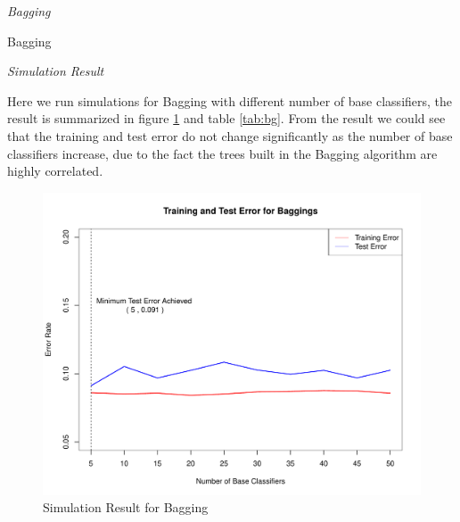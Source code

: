 \documentclass[12pt,oneside,a4paper]{article}
\begin{document}
\emph{Bagging}
\begin{algorithm}
\caption{Bagging}\label{algo_bg}
\end{algorithm}

\emph{Simulation Result}

Here we run simulations for Bagging with different number of base classifiers, the result is summarized in figure \ref{fig:bg} and table \ref{tab:bg}. From the result we could see that the training and test error do not change significantly as the number of base classifiers increase, due to the fact the trees built in the Bagging algorithm are highly correlated.

\begin{figure}[ht!]
    \centering
    \includegraphics[width=1\textwidth]{./figure/bg.pdf}
    \caption{Simulation Result for Bagging}
    \label{fig:bg}
\end{figure}
\end{document}
